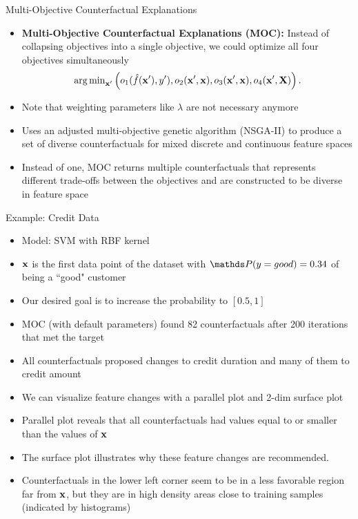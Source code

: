 \documentclass[11pt,compress,t,notes=noshow, aspectratio=169, xcolor=table]{beamer}
\begin{document}
\begin{frame}{Multi-Objective Counterfactual Explanations }
	\begin{itemize}
		\item \textbf{Multi-Objective Counterfactual Explanations (MOC):} Instead of collapsing objectives into a single objective, we could optimize all four objectives simultaneously
	$$	\argmin_{\xv'} \left(o_1(\fh(\xv'), y'), o_2(\xv', \xv), o_3(\xv', \xv), o_4(\xv', \Xmat) \right). $$
		
		\item Note that weighting parameters like $\lambda$ are not necessary anymore
		\item Uses an adjusted multi-objective genetic algorithm (NSGA-II) to produce a set of diverse counterfactuals for mixed discrete and continuous feature spaces
		\item Instead of one, MOC returns multiple counterfactuals that represents different trade-offs between the objectives and are constructed to be diverse in feature space
	\end{itemize}

\end{frame}

\begin{frame}{Example: Credit Data}
	\begin{itemize}
		\item Model: SVM with RBF kernel
		\item $\xv$ is the first data point of the dataset with $\P(y = good)  = 0.34$ of being a ``good" customer
		\item Our desired goal is to increase the probability to $[0.5, 1]$
		\item MOC (with default parameters) found 82 counterfactuals after 200 iterations that met the target
		\item All counterfactuals proposed changes to credit duration and many of them to credit amount
		\item We can visualize feature changes with a parallel plot and 2-dim surface plot
		\item Parallel plot reveals that all counterfactuals had values equal to or smaller than the values of $\xv$
		\item The surface plot illustrates why these feature changes are recommended. 
		\item Counterfactuals in the lower left corner seem to be in a less favorable region far from $\xv$, but they are in high density areas close to training samples (indicated by histograms)
	\end{itemize}
\end{frame}
\end{document}
